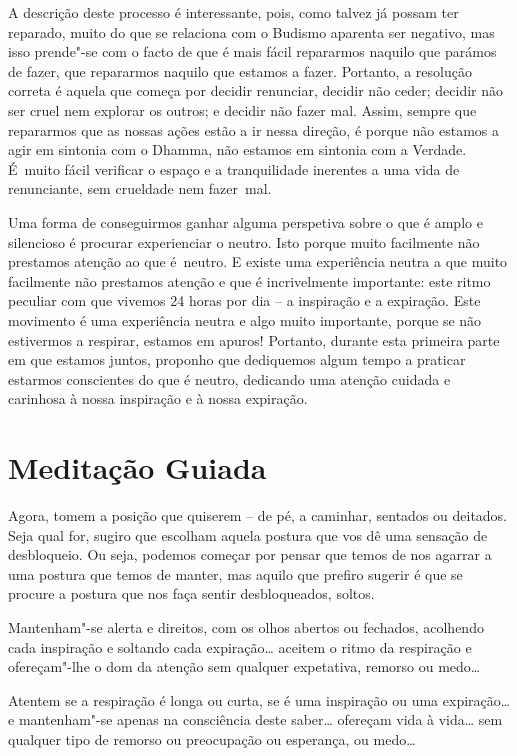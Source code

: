A descrição deste processo é interessante, pois, como talvez já possam ter
reparado, muito do que se relaciona com o Budismo aparenta ser negativo, mas
isso prende"-se com o facto de que é mais fácil repararmos naquilo que parámos de
fazer, que repararmos naquilo que estamos a fazer. Portanto, a resolução correta
é aquela que começa por decidir renunciar, decidir não ceder; decidir não ser
cruel nem explorar os outros; e decidir não fazer mal. Assim, sempre que
repararmos que as nossas ações estão a ir nessa direção, é porque não estamos a
agir em sintonia com o Dhamma, não estamos em sintonia com a Verdade. É~muito
fácil verificar o espaço e a tranquilidade inerentes a uma vida de renunciante,
sem crueldade nem fazer~mal.

Uma forma de conseguirmos ganhar alguma perspetiva sobre o que é amplo e
silencioso é procurar experienciar o neutro. Isto porque muito facilmente não
prestamos atenção ao que é~neutro. E existe uma experiência neutra a que muito
facilmente não prestamos atenção e que é incrivelmente importante: este ritmo
peculiar com que vivemos 24 horas por dia -- a inspiração e a expiração. Este
movimento é uma experiência neutra e algo muito importante, porque se não
estivermos a respirar, estamos em apuros! Portanto, durante esta primeira parte
em que estamos juntos, proponho que dediquemos algum tempo a praticar estarmos
conscientes do que é neutro, dedicando uma atenção cuidada e carinhosa à nossa
inspiração e à nossa expiração.

\section{Meditação Guiada}

\enlargethispage{\baselineskip}

Agora, tomem a posição que quiserem -- de pé, a caminhar, sentados ou deitados.
Seja qual for, sugiro que escolham aquela postura que vos dê uma sensação de
desbloqueio. Ou seja, podemos começar por pensar que temos de nos agarrar a uma
postura que temos de manter, mas aquilo que prefiro sugerir é que se procure a
postura que nos faça sentir desbloqueados, soltos.

Mantenham"-se alerta e direitos, com os olhos abertos ou fechados, acolhendo cada
inspiração e soltando cada expiração\ldots{} aceitem o ritmo da respiração e
ofereçam"-lhe o dom da atenção sem qualquer expetativa, remorso ou medo\ldots{}

Atentem se a respiração é longa ou curta, se é uma inspiração ou uma
expiração\ldots{} e mantenham"-se apenas na consciência deste saber\ldots{}
ofereçam vida à vida\ldots{} sem qualquer tipo de remorso ou preocupação ou
esperança, ou medo\ldots{}

